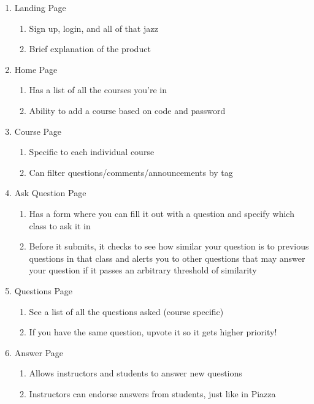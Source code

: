 \documentclass[preprint,11pt,3p]{article}
\begin{document}
\begin{enumerate}
	\item Landing Page
		\begin{enumerate}
			\item Sign up, login, and all of that jazz
			\item Brief explanation of the product
		\end{enumerate}
	\item Home Page
		\begin{enumerate}
			\item Has a list of all the courses you’re in
			\item Ability to add a course based on code and password
		\end{enumerate}
	\item Course Page
		\begin{enumerate}
			\item Specific to each individual course 
			\item Can filter questions/comments/announcements by tag
		\end{enumerate}
	\item Ask Question Page
		\begin{enumerate}
			\item Has a form where you can fill it out with a question and specify which class to ask it in 
			\item Before it submits, it checks to see how similar your question is to previous questions in that class and alerts you to other questions that may answer your question if it passes an arbitrary threshold of similarity  
		\end{enumerate}
	\item Questions Page
		\begin{enumerate}
			\item See a list of all the questions asked (course specific) 
			\item If you have the same question, upvote it so it gets higher priority! 
		\end{enumerate}
	\item Answer Page
		\begin{enumerate}
			\item Allows instructors and students to answer new questions 
			\item Instructors can endorse answers from students, just like in Piazza
		\end{enumerate}
\end{enumerate}	
\end{document}
